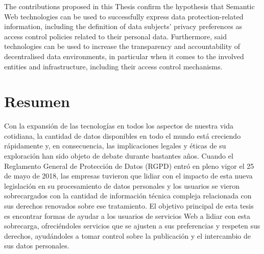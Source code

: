 The contributions proposed in this Thesis confirm the hypothesis that Semantic Web technologies can be used to successfully express data protection-related information, including the definition of data subjects' privacy preferences as access control policies related to their personal data.
Furthermore, said technologies can be used to increase the transparency and accountability of decentralised data environments, in particular when it comes to the involved entities and infrastructure, including their access control mechanisms.

\newpage
\section*{Resumen}
\label{sec::resumen}


Con la expansión de las tecnologías en todos los aspectos de nuestra vida cotidiana, la cantidad de datos disponibles en todo el mundo está creciendo rápidamente y, en consecuencia, las implicaciones legales y éticas de su exploración han sido objeto de debate durante bastantes años.
Cuando el Reglamento General de Protección de Datos (RGPD) entró en pleno vigor el 25 de mayo de 2018, las empresas tuvieron que lidiar con el impacto de esta nueva legislación en su procesamiento de datos personales y los usuarios se vieron sobrecargados con la cantidad de información técnica compleja relacionada con sus derechos renovados sobre ese tratamiento.
El objetivo principal de esta tesis es encontrar formas de ayudar a los usuarios de servicios Web a lidiar con esta sobrecarga, ofreciéndoles servicios que se ajusten a sus preferencias y respeten sus derechos, ayudándoles a tomar control sobre la publicación y el intercambio de sus datos personales.

